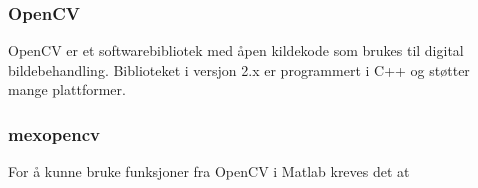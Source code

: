 \subsubsection{OpenCV}
OpenCV er et softwarebibliotek med åpen kildekode som brukes til digital bildebehandling. Biblioteket i versjon 2.x er programmert i C++ og støtter mange plattformer. \cite{docs:opencv}

\subsubsection{mexopencv}
For å kunne bruke funksjoner fra OpenCV i Matlab kreves det at \cite{mexopencv}
  
